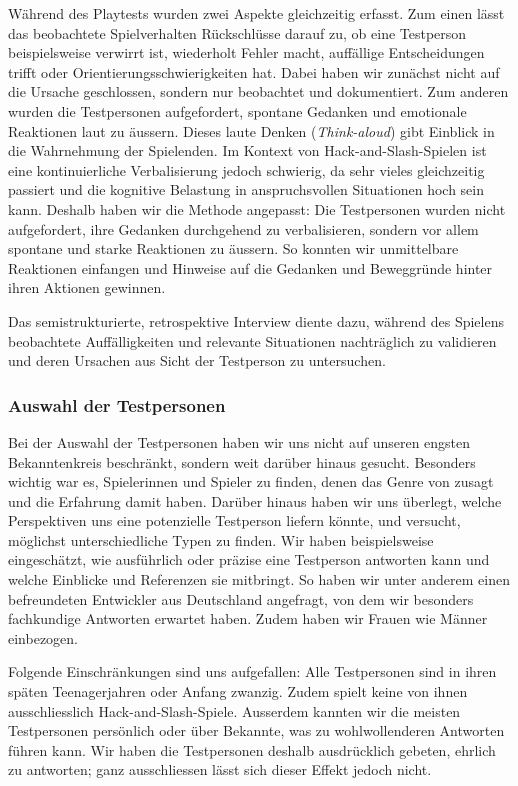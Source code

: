 \documentclass[../Main.tex]{subfiles}
\begin{document}
Während des Playtests wurden zwei Aspekte gleichzeitig erfasst. Zum einen lässt das beobachtete Spielverhalten Rückschlüsse darauf zu, ob eine Testperson beispielsweise verwirrt ist, wiederholt Fehler macht, auffällige Entscheidungen trifft oder Orientierungsschwierigkeiten hat. Dabei haben wir zunächst nicht auf die Ursache geschlossen, sondern nur beobachtet und dokumentiert. Zum anderen wurden die Testpersonen aufgefordert, spontane Gedanken und emotionale Reaktionen laut zu äussern. Dieses laute Denken (\textit{Think-aloud}) gibt Einblick in die Wahrnehmung der Spielenden.\autocite[\textcolor{red}{S.~??}]{drachen2018gamesuserresearch} Im Kontext von Hack-and-Slash-Spielen ist eine kontinuierliche Verbalisierung jedoch schwierig, da sehr vieles gleichzeitig passiert und die kognitive Belastung in anspruchsvollen Situationen hoch sein kann. Deshalb haben wir die Methode angepasst: Die Testpersonen wurden nicht aufgefordert, ihre Gedanken durchgehend zu verbalisieren, sondern vor allem spontane und starke Reaktionen zu äussern. So konnten wir unmittelbare Reaktionen einfangen und Hinweise auf die Gedanken und Beweggründe hinter ihren Aktionen gewinnen.

Das semistrukturierte, retrospektive Interview diente dazu, während des Spielens beobachtete Auffälligkeiten und relevante Situationen nachträglich zu validieren und deren Ursachen aus Sicht der Testperson zu untersuchen.\autocite[\textcolor{red}{S.~??}]{drachen2018gamesuserresearch}

\subsubsection{Auswahl der Testpersonen} \label{sec:AuswahlTP}
Bei der Auswahl der Testpersonen haben wir uns nicht auf unseren engsten Bekanntenkreis beschränkt, sondern weit darüber hinaus gesucht. Besonders wichtig war es, Spielerinnen und Spieler zu finden, denen das Genre von  zusagt und die Erfahrung damit haben. Darüber hinaus haben wir uns überlegt, welche Perspektiven uns eine potenzielle Testperson liefern könnte, und versucht, möglichst unterschiedliche Typen zu finden. Wir haben beispielsweise eingeschätzt, wie ausführlich oder präzise eine Testperson antworten kann und welche Einblicke und Referenzen sie mitbringt. So haben wir unter anderem einen befreundeten Entwickler aus Deutschland angefragt, von dem wir besonders fachkundige Antworten erwartet haben. Zudem haben wir Frauen wie Männer einbezogen.

Folgende Einschränkungen sind uns aufgefallen: Alle Testpersonen sind in ihren späten Teenagerjahren oder Anfang zwanzig. Zudem spielt keine von ihnen ausschliesslich Hack-and-Slash-Spiele. Ausserdem kannten wir die meisten Testpersonen persönlich oder über Bekannte, was zu wohlwollenderen Antworten führen kann. Wir haben die Testpersonen deshalb ausdrücklich gebeten, ehrlich zu antworten; ganz ausschliessen lässt sich dieser Effekt jedoch nicht.
\end{document}
